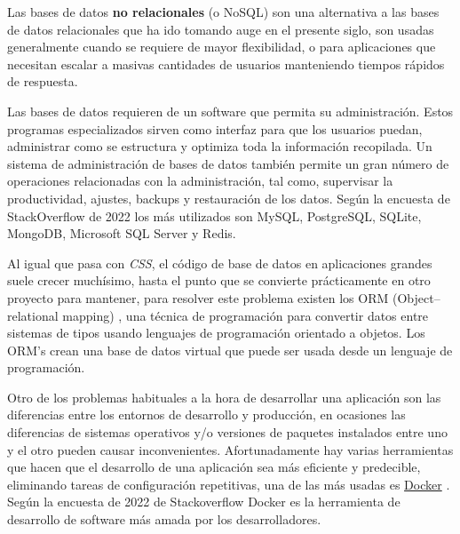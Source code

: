Las bases de datos \textbf{no relacionales} (o NoSQL) \cite{nosql} son una alternativa a las bases de datos relacionales que ha ido tomando auge en el presente siglo, son usadas generalmente cuando se requiere de mayor flexibilidad, o para aplicaciones que necesitan escalar a masivas cantidades de usuarios manteniendo tiempos rápidos de respuesta.
\newline

Las bases de datos requieren de un software que permita su administración. Estos programas especializados sirven como interfaz para que los usuarios puedan, administrar como se estructura y optimiza toda la información recopilada. Un sistema de administración de bases de datos también permite un gran número de operaciones relacionadas con la administración, tal como, supervisar la productividad, ajustes, backups y restauración de los datos. Según la encuesta de StackOverflow de 2022 \cite{encuesta2022} los más utilizados son MySQL, PostgreSQL, SQLite, MongoDB, Microsoft SQL Server y Redis.
\newline


Al igual que pasa con \textit{CSS}, el código de base de datos en aplicaciones grandes suele crecer muchísimo, hasta el punto que se convierte prácticamente en otro proyecto para mantener, para resolver este problema existen los ORM (Object–relational mapping) \cite{orm}, una técnica de programación para convertir datos entre sistemas de tipos usando lenguajes de programación orientado a objetos. Los ORM's crean una base de datos virtual que puede ser usada desde un lenguaje de programación.
\newline

Otro de los problemas habituales a la hora de desarrollar una aplicación son las diferencias entre los entornos de desarrollo y producción, en ocasiones las diferencias de sistemas operativos y/o versiones de paquetes instalados entre uno y el otro pueden causar inconvenientes. Afortunadamente hay varias herramientas que hacen que el desarrollo de una aplicación sea más eficiente y predecible, eliminando tareas de configuración repetitivas, una de las más usadas es \href{docker.com}{Docker} \cite{docker_docs}. Según la encuesta de 2022 de Stackoverflow \cite{encuesta2022} Docker es la herramienta de desarrollo de software más amada por los desarrolladores.






